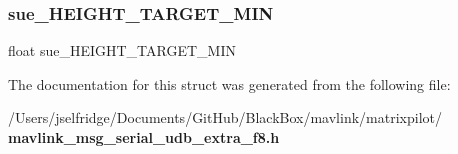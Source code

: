 \subsubsection{sue\+\_\+\+H\+E\+I\+G\+H\+T\+\_\+\+T\+A\+R\+G\+E\+T\+\_\+\+M\+IN}
{\footnotesize\ttfamily float sue\+\_\+\+H\+E\+I\+G\+H\+T\+\_\+\+T\+A\+R\+G\+E\+T\+\_\+\+M\+IN}



The documentation for this struct was generated from the following file\+:\begin{DoxyCompactItemize}
\item 
/\+Users/jselfridge/\+Documents/\+Git\+Hub/\+Black\+Box/mavlink/matrixpilot/\textbf{ mavlink\+\_\+msg\+\_\+serial\+\_\+udb\+\_\+extra\+\_\+f8.\+h}\end{DoxyCompactItemize}
